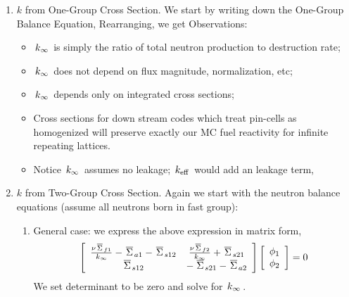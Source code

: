 \documentclass{school-22.211-notes}
\begin{document}
\begin{enumerate}
\item $k$ from One-Group Cross Section. We start by writing down the One-Group Balance Equation, 
Rearranging, we get 
Observations:
\begin{itemize}
\item $\left. k_{\infty} \right.$ is simply the ratio of total neutron production to destruction rate;
\item $\left. k_{\infty} \right.$ does not depend on flux magnitude, normalization, etc;
\item $\left. k_{\infty} \right.$ depends only on integrated cross sections;
\item Cross sections for down stream codes which treat pin-cells as homogenized will preserve exactly our MC fuel reactivity for infinite repeating lattices. 
\item Notice $\left. k_{\infty} \right.$ assumes no leakage; $\left. k_{\mathrm{eff}} \right.$ would add an leakage term,
\end{itemize}


\item $k$ from Two-Group Cross Section. Again we start with the neutron balance equations (assume all neutrons born in fast group):
\begin{enumerate}
\item General case: we express the above expression in matrix form, 
  \begin{align}
    \left[ \begin{array}{cc} 
        \frac{\nu \left.\overline{\Sigma} \right._{f1}}{\left. k_{\infty} \right.} -  \left.\overline{\Sigma} \right._{a1}  - \left.\overline{\Sigma} \right._{s12} & \frac{\nu \left.\overline{\Sigma} \right._{f2}}{\left. k_{\infty} \right.}  + \left.\overline{\Sigma} \right._{s21}  \\
        \left.\overline{\Sigma} \right._{s12} & - \left.\overline{\Sigma} \right._{s21} - \left.\overline{\Sigma} \right._{a2}  
      \end{array} \right] 
    \left[ \begin{array}{c} \phi_1 \\ \phi_2 \end{array} \right] = 0
  \end{align}
  We set determinant to be zero and solve for $\left. k_{\infty} \right.$. 


\end{enumerate}
\end{enumerate}
\end{document}
